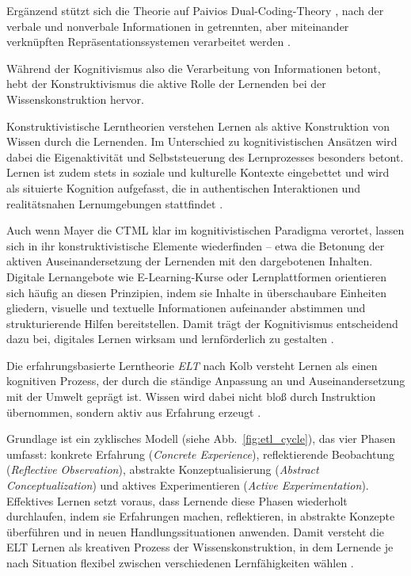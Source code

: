 Ergänzend stützt sich die Theorie auf Paivios Dual-Coding-Theory \parencite[S.~102f]{paivia_dual_2006}, nach der verbale und nonverbale Informationen in getrennten, aber miteinander verknüpften Repräsentationssystemen verarbeitet werden \parencite[S.~66f]{furstenau_lehr-lern-theorien_2019}.

Während der Kognitivismus also die Verarbeitung von Informationen betont, hebt der Konstruktivismus die aktive Rolle der Lernenden bei der Wissenskonstruktion hervor.

Konstruktivistische Lerntheorien verstehen Lernen als aktive Konstruktion von Wissen durch die Lernenden. Im Unterschied zu kognitivistischen Ansätzen wird dabei die Eigenaktivität und Selbststeuerung des Lernprozesses besonders betont. Lernen ist zudem stets in soziale und kulturelle Kontexte eingebettet und wird als situierte Kognition aufgefasst, die in authentischen Interaktionen und realitätsnahen Lernumgebungen stattfindet \parencite[S.~1f]{furstenau_lehr-lern-theorien_2019}.

Auch wenn Mayer die \ac{CTML} klar im kognitivistischen Paradigma verortet, lassen sich in ihr konstruktivistische Elemente wiederfinden – etwa die Betonung der aktiven Auseinandersetzung der Lernenden mit den dargebotenen Inhalten. Digitale Lernangebote wie E-Learning-Kurse oder Lernplattformen orientieren sich häufig an diesen Prinzipien, indem sie Inhalte in überschaubare Einheiten gliedern, visuelle und textuelle Informationen aufeinander abstimmen und strukturierende Hilfen bereitstellen. Damit trägt der Kognitivismus entscheidend dazu bei, digitales Lernen wirksam und lernförderlich zu gestalten \parencites[S.~105--106]{mayer_multimedia_2001}{mayer_mayers_nodate}.

Die erfahrungsbasierte Lerntheorie \textit{\ac{ELT}} nach Kolb versteht Lernen als einen kognitiven Prozess, der durch die ständige Anpassung an und Auseinandersetzung mit der Umwelt geprägt ist. Wissen wird dabei nicht bloß durch Instruktion übernommen, sondern aktiv aus Erfahrung erzeugt \parencite[S.~30]{bergsteiner_kolbs_2010}.

Grundlage ist ein zyklisches Modell (siehe Abb.~\ref{fig:etl_cycle}), das vier Phasen umfasst: konkrete Erfahrung (\textit{Concrete Experience}), reflektierende Beobachtung (\textit{Reflective Observation}), abstrakte Konzeptualisierung (\textit{Abstract Conceptualization}) und aktives Experimentieren (\textit{Active Experimentation}). Effektives Lernen setzt voraus, dass Lernende diese Phasen wiederholt durchlaufen, indem sie Erfahrungen machen, reflektieren, in abstrakte Konzepte überführen und in neuen Handlungssituationen anwenden. Damit versteht die ELT Lernen als kreativen Prozess der Wissenskonstruktion, in dem Lernende je nach Situation flexibel zwischen verschiedenen Lernfähigkeiten wählen \parencite[S.~2--3]{mccarthy_experiential_2010}.


